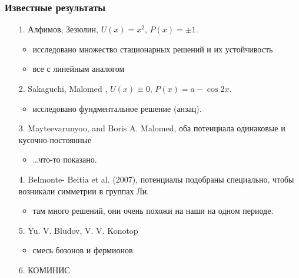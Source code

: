 \documentclass [10pt] {beamer}
\begin{document}
\begin{frame}
	\frametitle{Известные результаты}
	
	\begin{enumerate}
		\setlength\itemsep{10pt}
		\item[1.] Алфимов, Зезюлин, $U(x) = x^2$, $P(x) = \pm 1$.
		\begin{itemize}
			\item исследовано множество стационарных решений и их устойчивость
			\item все с линейным аналогом
		\end{itemize}
		\item[2.] Sakaguchi, Malomed	, $U(x) \equiv 0$, $P(x) = a - \cos 2x$.
		\begin{itemize}
			\item исследовано фундментальное решение (анзац).
		\end{itemize}
		\item[3.] Mayteevarunyoo, and Boris A. Malomed, оба потенциала одинаковые и кусочно-постоянные
		\begin{itemize}
			\item \dots что-то показано.
		\end{itemize}
		\item[4.] Belmonte- Beitia et al. (2007), потенциалы подобраны специально, чтобы возникали симметрии в группах Ли.
		\begin{itemize}
			\item там много решений, они очень похожи на наши на одном периоде.
		\end{itemize}
		\item[5.] Yu. V. Bludov, V. V. Konotop
		\begin{itemize}
			\item смесь бозонов и фермионов
		\end{itemize}
		\item[6.] КОМИНИС
	\end{enumerate}
\end{frame}
\end{document}

